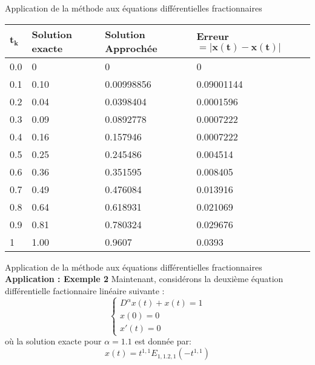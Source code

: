 \documentclass{sintefbeamer}
\begin{document}
\begin{frame}{Application de la méthode aux équations
différentielles fractionnaires}
    \begin{table}[H]\label{tab:1}
\begin{tabular*}{\textwidth}{llll}
$\mathbf{t_k}$ & \textbf{Solution exacte} & \textbf{Solution Approchée}  & \textbf{Erreur} $\mathbf{= |x(t)-x(t)|}$    \\ 
\hline
0.0   & 0    & 0          & 0                 \\
0.1   & 0.10 & 0.00998856 & 0.09001144 \\
0.2   & 0.04 & 0.0398404  & 0.0001596  \\
0.3   & 0.09 & 0.0892778  & 0.0007222 \\
0.4   & 0.16 & 0.157946   & 0.0007222 \\
0.5   & 0.25 & 0.245486   & 0.004514 \\
0.6   & 0.36 & 0.351595   & 0.008405 \\
0.7   & 0.49 & 0.476084   & 0.013916  \\
0.8   & 0.64 & 0.618931   & 0.021069 \\
0.9   & 0.81 & 0.780324   & 0.029676 \\
1     & 1.00 & 0.9607     & 0.0393 \\
\hline
\end{tabular*}
\end{table}
\end{frame}






\begin{frame}{Application de la méthode aux équations différentielles fractionnaires}
    \textbf{Application : Exemple 2}
    Maintenant, considérons la deuxième équation différentielle factionnaire linéaire suivante :
\begin{equation}\label{ex:EDF_2}
    \begin{cases}
        D^{\alpha} x(t) +x(t) = 1\\
        x(0)=0\\
        x'(t) =0
    \end{cases}
\end{equation}
où la solution exacte pour $\alpha = 1.1$ est donnée par:
\begin{equation}
    x(t)=t^{1,1} E_{1,1. 2,1} (-t^{1,1})
\end{equation}
\end{frame}
\end{document}
